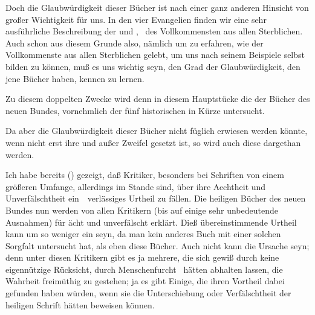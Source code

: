 \begin{aufza}
\item Doch die Glaubwürdigkeit dieser Bücher ist nach einer ganz anderen Hinsicht von großer Wichtigkeit für uns. In den vier Evangelien finden wir eine sehr ausführliche Beschreibung der  und , \dh\ des Vollkommensten aus allen Sterblichen. Auch schon aus diesem Grunde also, nämlich um zu erfahren, wie der Vollkommenste aus allen Sterblichen gelebt, um uns nach seinem Beispiele selbst bilden zu können, muß es uns wichtig seyn, den Grad der Glaubwürdigkeit, den jene Bücher haben, kennen zu lernen.
\item Zu diesem doppelten Zwecke wird denn in diesem Hauptstücke die  der Bücher des neuen Bundes, vornehmlich der fünf historischen in Kürze untersucht.
\item Da aber die Glaubwürdigkeit dieser Bücher nicht füglich erwiesen werden könnte, wenn nicht erst ihre  und  außer Zweifel gesetzt ist, so wird auch diese dargethan werden.
\end{aufza}

Ich habe bereits () gezeigt, daß Kritiker, besonders bei Schriften von einem größeren Umfange, allerdings im Stande sind, über ihre Aechtheit und Unverfälschtheit ein~\ verlässiges Urtheil zu fällen. Die heiligen Bücher des neuen Bundes nun werden von allen Kritikern (bis auf einige sehr unbedeutende Ausnahmen) für ächt und unverfälscht erklärt. Dieß übereinstimmende Urtheil kann um so weniger ein  seyn, da man kein anderes Buch mit einer solchen Sorgfalt untersucht hat, als eben diese Bücher. Auch nicht  kann die Ursache seyn; denn unter diesen Kritikern gibt es ja mehrere, die sich gewiß durch keine eigennützige Rücksicht, durch Menschenfurcht \udgl\  hätten abhalten lassen, die Wahrheit freimüthig zu gestehen; ja es gibt Einige, die ihren Vortheil dabei gefunden haben würden, wenn sie die Unterschiebung oder Verfälschtheit der heiligen Schrift hätten beweisen können.

